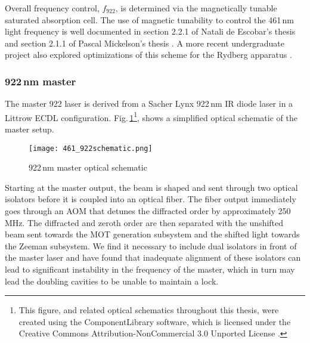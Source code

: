Overall frequency control, $f_{922}$, is determined via the magnetically tunable saturated absorption cell.
The use of magnetic tunability to control the 461\,nm light frequency is well documented in section 2.2.1 of Natali de Escobar's thesis \cite{MartinezdeEscolar2010} and section 2.1.1 of Pascal Mickelson's thesis \cite{Mickelson2010b}.
A more recent undergraduate project also explored optimizations of this scheme for the Rydberg apparatus \cite{MichaelViray2014}.

\subsubsection{922\,nm master}
The master 922 laser is derived from a Sacher Lynx 922\,nm IR diode laser in a Littrow ECDL configuration.
Fig.\,\ref{fig:922optical}\footnote{This figure, and related optical schematics throughout this thesis, were created using the ComponentLibrary software, which is licensed under the Creative Commons Attribution-NonCommercial 3.0 Unported License \cite{Franzen}.}, shows a simplified optical schematic of the master setup.
	\begin{figure}
		\centerline{
		\texttt{[image: 461\_922schematic.png]}}
		\caption{922\,nm master optical schematic}
		\label{fig:922optical}
	\end{figure} 
	
Starting at the master output, the beam is shaped and sent through two optical isolators before it is coupled into an optical fiber.
The fiber output immediately goes through an AOM that detunes the diffracted order by approximately 250\,MHz.
The diffracted and zeroth order are then separated with the unshifted beam sent towards the MOT generation subsystem and the shifted light towards the Zeeman subsystem.
We find it necessary to include dual isolators in front of the master laser and have found that inadequate alignment of these isolators can lead to significant instability in the frequency of the master, which in turn may lead the doubling cavities to be unable to maintain a lock.

